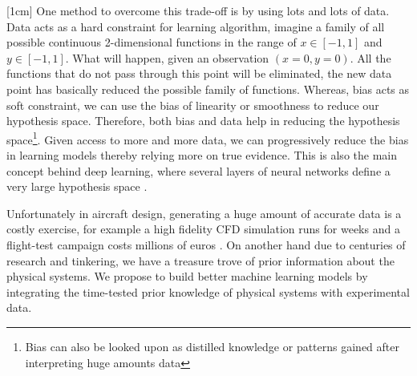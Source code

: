 [1cm]
One method to overcome this trade-off is by using lots and lots of data. Data acts as a hard constraint for learning algorithm, imagine a family of all possible continuous 2-dimensional functions in the range of $x \in [-1, 1]$ and $y \in [-1, 1]$. What will happen, given an observation $(x = 0, y = 0)$. All the functions that do not pass through this point will be eliminated, the new data point has basically reduced the possible family of functions. Whereas, bias acts as soft constraint, we can use the bias of linearity or smoothness to reduce our hypothesis space. Therefore, both bias and data help in reducing the hypothesis space\footnote{Bias can also be looked upon as distilled knowledge or patterns gained after interpreting huge amounts data}. Given access to more and more data, we can progressively reduce the bias in learning models thereby relying more on true evidence. This is also the main concept behind deep learning, where several layers of neural networks define a very large hypothesis space \cite{Goodfellow-et-al-2016, lecun2015deep}. 

Unfortunately in aircraft design, generating a huge amount of accurate data is a costly exercise, for example a high fidelity CFD simulation runs for weeks \cite{murthy2014computational, jameson2012computational, forrester2008engineering} and a flight-test campaign costs millions of euros \cite{fox2004test}. On another hand due to centuries of research and tinkering, we have a treasure trove of prior information about the physical systems. We propose to build better machine learning models by integrating the time-tested prior knowledge of physical systems with experimental data. 


